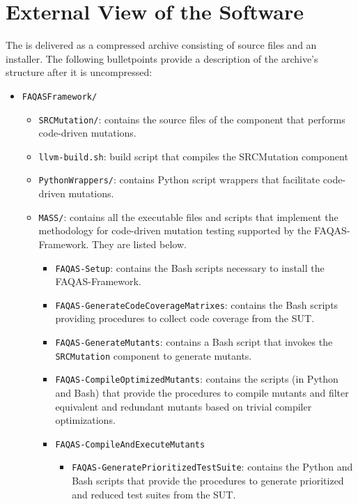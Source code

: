 
\chapter{External View of the Software}

The \FAQAS is delivered as a compressed archive consisting of source files and an installer.
The following bulletpoints provide a description of the archive's structure after it is uncompressed:

\begin{itemize}
	\item \texttt{FAQASFramework/}
	\begin{itemize}
		\item \texttt{SRCMutation/}: contains the source files of the component that performs code-driven mutations.
		\item \texttt{llvm-build.sh}: build script that compiles the SRCMutation component
		\item \texttt{PythonWrappers/}: contains Python script wrappers that facilitate code-driven mutations.
		\item \texttt{MASS/}: contains all the executable files and scripts that implement the methodology for code-driven mutation testing supported by  the FAQAS-Framework. They are listed below.
		\begin{itemize}
			\item \texttt{FAQAS-Setup}: contains the Bash scripts necessary to install the FAQAS-Framework.
			\item \texttt{FAQAS-GenerateCodeCoverageMatrixes}: contains the Bash scripts providing procedures to collect code coverage from the SUT.
			\item \texttt{FAQAS-GenerateMutants}: contains a Bash script that invokes the \texttt{SRCMutation} component to generate mutants.
			\item \texttt{FAQAS-CompileOptimizedMutants}: contains the scripts (in Python and Bash)  that provide the procedures to compile mutants and filter equivalent and redundant mutants based on trivial compiler optimizations.
			\item \texttt{FAQAS-CompileAndExecuteMutants}
			\begin{itemize}
				\item \texttt{FAQAS-GeneratePrioritizedTestSuite}: contains the Python and Bash scripts that provide the procedures to generate prioritized and reduced test suites from the SUT.


\end{itemize}
\end{itemize}
\end{itemize}
\end{itemize}
